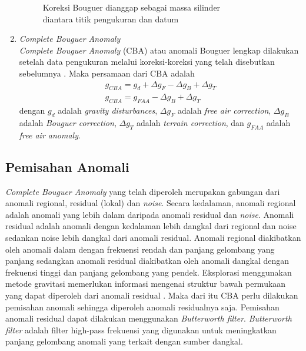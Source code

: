 \begin{enumerate}
\begin{figure}[h]
		\captionsetup{justification=centering}
		\caption{Koreksi Bouguer dianggap sebagai massa silinder \\ diantara titik pengukuran dan datum}
		\label{fig:BC}
	\end{figure}
	\item \textit{Complete Bouguer Anomaly}\\
	\textit{Complete Bouguer Anomaly} (CBA) atau anomali Bouguer lengkap dilakukan setelah data pengukuran melalui koreksi-koreksi yang telah disebutkan sebelumnya \citep{Telford}. Maka persamaan dari CBA adalah
	\begin{align}
		g_{CBA} = g_{d} + \Delta g_{F} - \Delta g_{B} + \Delta g_{T}\\
		g_{CBA} = g_{FAA} - \Delta g_{B} + \Delta g_{T} \label{eqn:CBA2}
	\end{align}
	dengan $g_{d}$ adalah \textit{gravity disturbances}, $\Delta g_{F}$ adalah \textit{free air correction}, $\Delta g_{B}$ adalah \textit{Bouguer correction}, $\Delta g_{T}$ adalah \textit{terrain correction}, dan $g_{FAA}$ adalah \textit{free air anomaly}.
	\vskip 5pt
\end{enumerate}
\subsection{Pemisahan Anomali}
\hspace{25pt}\textit{Complete Bouguer Anomaly} yang telah diperoleh merupakan gabungan dari anomali regional, residual (lokal) dan \textit{noise}. Secara kedalaman, anomali regional adalah anomali yang lebih dalam daripada anomali residual dan \textit{noise}. Anomali residual adalah anomali dengan kedalaman lebih dangkal dari regional dan noise sedankan noise lebih dangkal dari anomali residual. Anomali regional diakibatkan oleh anomali dalam dengan frekuensi rendah dan panjang gelombang yang panjang sedangkan anomali residual diakibatkan oleh anomali dangkal dengan frekuensi tinggi dan panjang gelombang yang pendek. Eksplorasi menggunakan metode gravitasi memerlukan informasi mengenai struktur bawah permukaan yang dapat diperoleh dari anomali residual \citep{Telford}. Maka dari itu CBA perlu dilakukan pemisahan anomali sehingga diperoleh anomali residualnya saja. Pemisahan anomali residual dapat dilakukan menggunakan \textit{Butterworth filter}. \textit{Butterworth filter} adalah filter high-pass frekuensi yang digunakan untuk meningkatkan panjang gelombang anomali yang terkait dengan sumber dangkal.
